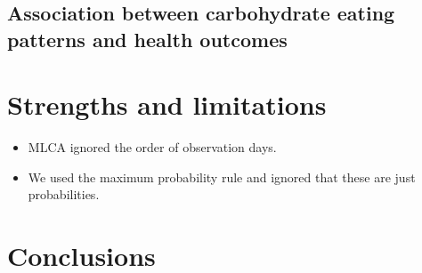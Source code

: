 \subsection{Association between carbohydrate eating patterns and health outcomes}












\section{Strengths and limitations}



\begin{itemize}
	\item MLCA ignored the order of observation days.
	\item We used the maximum probability rule and ignored that these are just probabilities.
\end{itemize}



\section{Conclusions}